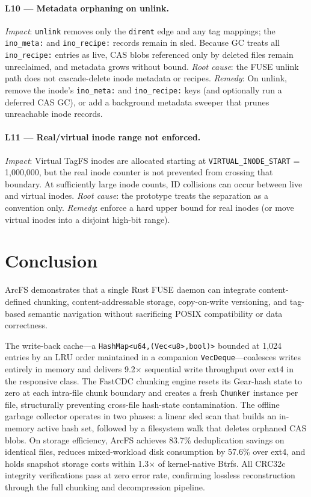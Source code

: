 \documentclass[journal]{IEEEtran}
\begin{document}
\paragraph{L10 — Metadata orphaning on unlink.}
\textit{Impact}: \texttt{unlink} removes only the \texttt{dirent} edge
and any tag mappings; the \texttt{ino\_meta:} and \texttt{ino\_recipe:}
records remain in sled.  Because GC treats all \texttt{ino\_recipe:}
entries as live, CAS blobs referenced only by deleted files remain
unreclaimed, and metadata grows without bound.  \textit{Root cause}:
the FUSE unlink path does not cascade-delete inode metadata or recipes.
\textit{Remedy}: On unlink, remove the inode's \texttt{ino\_meta:} and
\texttt{ino\_recipe:} keys (and optionally run a deferred CAS GC), or
add a background metadata sweeper that prunes unreachable inode records.

\paragraph{L11 — Real/virtual inode range not enforced.}
\textit{Impact}: Virtual TagFS inodes are allocated starting at
\texttt{VIRTUAL\_INODE\_START} = 1,000,000, but the real inode counter
is not prevented from crossing that boundary.  At sufficiently large
inode counts, ID collisions can occur between live and virtual inodes.
\textit{Root cause}: the prototype treats the separation as a convention
only.  \textit{Remedy}: enforce a hard upper bound for real inodes (or
move virtual inodes into a disjoint high-bit range).

\section{Conclusion}

ArcFS demonstrates that a single Rust FUSE daemon can integrate
content-defined chunking, content-addressable storage, copy-on-write
versioning, and tag-based semantic navigation without sacrificing POSIX
compatibility or data correctness.

The write-back cache---a \texttt{HashMap\textless{}u64,(Vec\textless{}u8\textgreater{},bool)\textgreater{}}
bounded at 1,024 entries by an LRU order maintained in a companion
\texttt{VecDeque}---coalesces writes entirely in memory and delivers
9.2$\times$ sequential write throughput over ext4 in the responsive class.
The FastCDC chunking engine resets its Gear-hash state to zero at each
intra-file chunk boundary and creates a fresh \texttt{Chunker} instance
per file, structurally preventing cross-file hash-state contamination.
The offline garbage collector operates in two phases: a linear sled
scan that builds an in-memory active hash set, followed by a filesystem
walk that deletes orphaned CAS blobs.  On storage efficiency, ArcFS
achieves 83.7\% deduplication savings on identical files, reduces
mixed-workload disk consumption by 57.6\% over ext4, and holds snapshot
storage costs within 1.3$\times$ of kernel-native Btrfs. All CRC32c
integrity verifications pass at zero error rate, confirming lossless
reconstruction through the full chunking and decompression pipeline.
\end{document}

